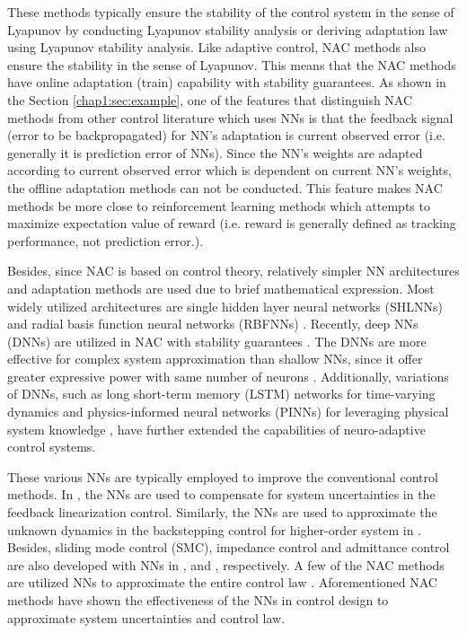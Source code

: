 These methods typically ensure the stability of the control system in the sense of Lyapunov by conducting Lyapunov stability analysis or deriving adaptation law using Lyapunov stability analysis.
Like adaptive control, NAC methods also ensure the stability in the sense of Lyapunov. 
This means that the NAC methods have online adaptation (train) capability with stability guarantees. 
As shown in the Section \ref{chap1:sec:example}, one of the features that distinguish NAC methods from other control literature which uses NNs is that the feedback signal (error to be backpropagated) for NN’s adaptation is current observed error (i.e. generally it is prediction error of NNs). 
Since the NN’s weights are adapted according to current observed error which is dependent on current NN’s weights, the offline adaptation methods can not be conducted. 
This feature makes NAC methods be more close to reinforcement learning methods which attempts to maximize expectation value of reward (i.e. reward is generally defined as tracking performance, not prediction error.).

Besides, since NAC is based on control theory, relatively simpler NN architectures and adaptation methods are used due to brief mathematical expression.
Most widely utilized architectures are single hidden layer neural networks (SHLNNs) \cite{RN69, RN18, RN85, RN46, RN95, RN108} and radial basis function neural networks (RBFNNs) \cite{RN89, RN82, RN64, RN71, RN19, RN21}.
Recently, deep NNs (DNNs) are utilized in NAC with stability guarantees \cite{RN13}.
The DNNs are more effective for complex system approximation than shallow NNs, since it offer greater expressive power with same number of neurons \cite{RN65}.
Additionally, variations of DNNs, such as long short-term memory (LSTM) networks for time-varying dynamics \cite{RN11} and physics-informed neural networks (PINNs) for leveraging physical system knowledge \cite{RN12}, have further extended the capabilities of neuro-adaptive control systems.

These various NNs are typically employed to improve the conventional control methods.
In \cite{RN69, RN95}, the NNs are used to compensate for system uncertainties in the feedback linearization control.
Similarly, the NNs are used to approximate the unknown dynamics in the backstepping control for higher-order system in \cite{RN85, RN19, RN71, RN80}.
Besides, sliding mode control (SMC), impedance control and admittance control are also developed with NNs in \cite{RN64}, \cite{RN89} and \cite{RN82}, respectively.
A few of the NAC methods are utilized NNs to approximate the entire control law \cite{RN46}.
Aforementioned NAC methods have shown the effectiveness of the NNs in control design to approximate system uncertainties and control law.

